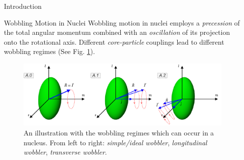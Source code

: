 \documentclass[final]{beamer}
\newlength{\sepwidth}
\newlength{\colwidth}
\newcommand{\separatorcolumn}{\begin{column}{\sepwidth}\end{column}}
\begin{document}
\begin{frame}[t]
\begin{columns}[t]
\separatorcolumn
\begin{column}{\colwidth}
  \begin{block}{Introduction}



  \end{block}
\begin{block}{Wobbling Motion in Nuclei}
  Wobbling motion in nuclei employs a \emph{precession} of the total angular momentum combined with an \emph{oscillation} of its projection onto the rotational axis. Different \emph{core-particle} couplings lead to different wobbling regimes (See Fig. \ref{wobbling-regimes}).
  \begin{figure}
      \centering
     \includegraphics[scale=1.7]{images/wobbling_Regimes_COUPLING_SCHEME.pdf}
      \caption{An illustration with the wobbling regimes which can occur in a nucleus. From left to right: \emph{simple/ideal wobbler}, \emph{longitudinal wobbler}, \emph{transverse wobbler}.}
      \label{wobbling-regimes}
  \end{figure}


\end{block}
\end{column}
\end{columns}
\end{frame}
\end{document}
